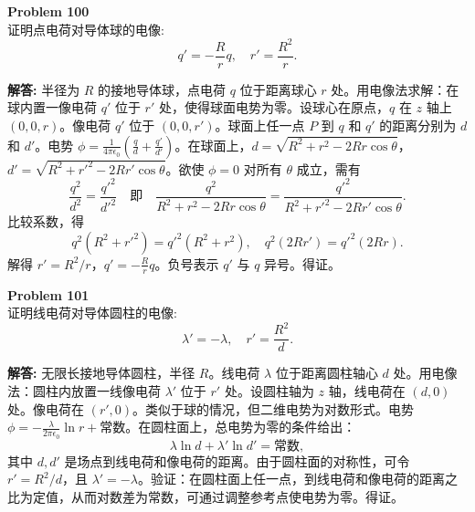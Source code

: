 \documentclass[12pt, a4paper, oneside]{ctexart}
\newenvironment{solution}{\par\noindent\textbf{解答:}\quad}{\par}
\begin{document}
\begin{mdframed}[backgroundcolor=gray!10, linewidth=0pt]
    \textbf{Problem 100} \\
    证明点电荷对导体球的电像:
    \[
    q' = -\frac{R}{r} q, \quad r' = \frac{R^2}{r}.
    \]
\end{mdframed}
\begin{solution}
    半径为 $R$ 的接地导体球，点电荷 $q$ 位于距离球心 $r$ 处。用电像法求解：在球内置一像电荷 $q'$ 位于 $r'$ 处，使得球面电势为零。设球心在原点，$q$ 在 $z$ 轴上 $(0,0,r)$。像电荷 $q'$ 位于 $(0,0,r')$。球面上任一点 $P$ 到 $q$ 和 $q'$ 的距离分别为 $d$ 和 $d'$。电势 $\phi = \frac{1}{4\pi\epsilon_0} \left( \frac{q}{d} + \frac{q'}{d'} \right)$。在球面上，$d = \sqrt{R^2 + r^2 - 2Rr \cos\theta}$，$d' = \sqrt{R^2 + r'^2 - 2Rr' \cos\theta}$。欲使 $\phi=0$ 对所有 $\theta$ 成立，需有
    \[
    \frac{q^2}{d^2} = \frac{q'^2}{d'^2} \quad \text{即} \quad \frac{q^2}{R^2 + r^2 - 2Rr \cos\theta} = \frac{q'^2}{R^2 + r'^2 - 2Rr' \cos\theta}.
    \]
    比较系数，得
    \[
    q^2 (R^2 + r'^2) = q'^2 (R^2 + r^2), \quad q^2 (2Rr') = q'^2 (2Rr).
    \]
    解得 $r' = R^2 / r$，$q' = -\frac{R}{r} q$。负号表示 $q'$ 与 $q$ 异号。得证。
\end{solution}

\begin{mdframed}[backgroundcolor=gray!10, linewidth=0pt]
    \textbf{Problem 101} \\
    证明线电荷对导体圆柱的电像:
    \[
    \lambda' = -\lambda, \quad r' = \frac{R^2}{d}.
    \]
\end{mdframed}
\begin{solution}
    无限长接地导体圆柱，半径 $R$。线电荷 $\lambda$ 位于距离圆柱轴心 $d$ 处。用电像法：圆柱内放置一线像电荷 $\lambda'$ 位于 $r'$ 处。设圆柱轴为 $z$ 轴，线电荷在 $(d,0)$ 处。像电荷在 $(r',0)$。类似于球的情况，但二维电势为对数形式。电势 $\phi = -\frac{\lambda}{2\pi\epsilon_0} \ln r + \text{常数}$。在圆柱面上，总电势为零的条件给出：
    \[
    \lambda \ln d + \lambda' \ln d' = \text{常数},
    \]
    其中 $d, d'$ 是场点到线电荷和像电荷的距离。由于圆柱面的对称性，可令 $r' = R^2/d$，且 $\lambda' = -\lambda$。验证：在圆柱面上任一点，到线电荷和像电荷的距离之比为定值，从而对数差为常数，可通过调整参考点使电势为零。得证。
\end{solution}
\end{document}
